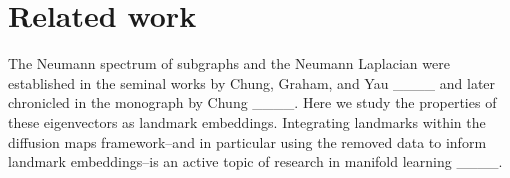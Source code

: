 \section{Related work}
The Neumann spectrum of subgraphs and the Neumann Laplacian were established in the seminal works by Chung, Graham, and Yau ____ and later chronicled in the monograph by Chung ____. Here we study the properties of these eigenvectors as landmark embeddings. Integrating landmarks within the diffusion maps framework--and in particular using the removed data to inform landmark embeddings--is an active topic of research in manifold learning ____.